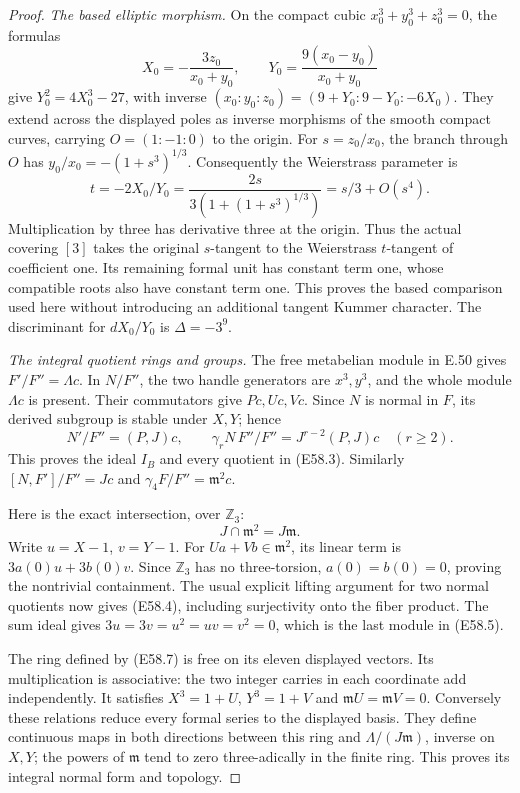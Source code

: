 \begin{proof}
\emph{The based elliptic morphism.}
On the compact cubic $x_0^3+y_0^3+z_0^3=0$, the formulas
\[
 X_0=-\frac{3z_0}{x_0+y_0},\qquad
 Y_0=\frac{9(x_0-y_0)}{x_0+y_0}
 \tag{E58.15}
\]
give $Y_0^2=4X_0^3-27$, with inverse
$(x_0:y_0:z_0)=(9+Y_0:9-Y_0:-6X_0)$.
They extend across the displayed poles as inverse morphisms of
the smooth compact curves, carrying $O=(1:-1:0)$ to the origin.
For $s=z_0/x_0$, the branch through $O$ has
$y_0/x_0=-(1+s^3)^{1/3}$. Consequently the Weierstrass parameter
is
\[
 t=-2X_0/Y_0
   =\frac{2s}{3(1+(1+s^3)^{1/3})}
   =s/3+O(s^4).
 \tag{E58.16}
\]
Multiplication by three has derivative three at the origin.
Thus the actual covering $[3]$ takes the original $s$-tangent to
the Weierstrass $t$-tangent of coefficient one. Its remaining
formal unit has constant term one, whose compatible roots also
have constant term one. This proves the based comparison used
here without introducing an additional tangent Kummer character.
The discriminant for $dX_0/Y_0$ is $\Delta=-3^9$.

\emph{The integral quotient rings and groups.}
The free metabelian module in E.50 gives $F'/F''=\Lambda c$.
In $N/F''$, the two handle generators are $x^3,y^3$, and the
whole module $\Lambda c$ is present. Their commutators give
$Pc,Uc,Vc$. Since $N$ is normal in $F$, its derived subgroup
is stable under $X,Y$; hence
\[
 N'/F''=(P,J)c,
 \qquad \gamma_rN\,F''/F''=J^{r-2}(P,J)c\quad(r\ge2).
 \tag{E58.17}
\]
This proves the ideal $I_B$ and every quotient in (E58.3).
Similarly $[N,F']/F''=Jc$ and $\gamma_4F/F''=\mathfrak m^2c$.

Here is the exact intersection, over $\mathbb Z_3$:
\[
                         J\cap\mathfrak m^2=J\mathfrak m.
 \tag{E58.18}
\]
Write $u=X-1$, $v=Y-1$.
For $Ua+Vb\in\mathfrak m^2$, its linear term is
$3a(0)u+3b(0)v$. Since $\mathbb Z_3$ has no three-torsion,
$a(0)=b(0)=0$, proving the nontrivial containment.
The usual explicit lifting argument for two normal quotients
now gives (E58.4), including surjectivity onto the fiber product.
The sum ideal gives $3u=3v=u^2=uv=v^2=0$, which is the last
module in (E58.5).

The ring defined by (E58.7) is free on its eleven displayed
vectors. Its multiplication is associative: the two integer carries
in each coordinate add independently. It satisfies $X^3=1+U$,
$Y^3=1+V$ and $\mathfrak m U=\mathfrak m V=0$.
Conversely these relations reduce every formal series to the
displayed basis. They define continuous maps in both directions
between this ring and $\Lambda/(J\mathfrak m)$, inverse on $X,Y$;
the powers of $\mathfrak m$ tend to zero three-adically in the
finite ring. This proves its integral normal form and topology.


\end{proof}
